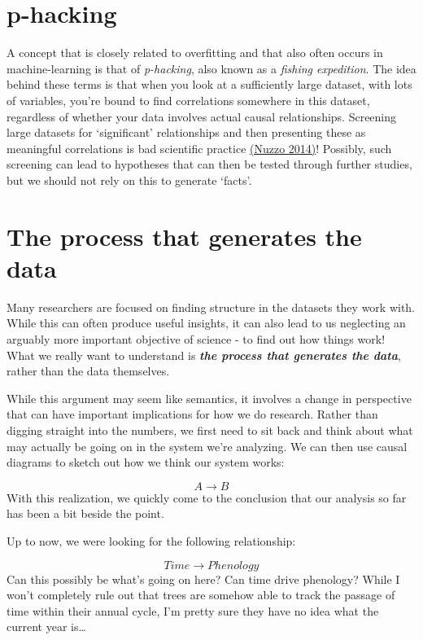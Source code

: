 \documentclass[
]{book}
\begin{document}
\hypertarget{p-hacking}{%
\section{p-hacking}\label{p-hacking}}

A concept that is closely related to overfitting and that also often occurs in machine-learning is that of \emph{p-hacking}, also known as a \emph{fishing expedition}. The idea behind these terms is that when you look at a sufficiently large dataset, with lots of variables, you're bound to find correlations somewhere in this dataset, regardless of whether your data involves actual causal relationships. Screening large datasets for `significant' relationships and then presenting these as meaningful correlations is bad scientific practice \href{https://www.nature.com/news/scientific-method-statistical-errors-1.14700}{(Nuzzo \protect\hyperlink{ref-nuzzo2014scientific}{2014})}! Possibly, such screening can lead to hypotheses that can then be tested through further studies, but we should not rely on this to generate `facts'.

\hypertarget{the-process-that-generates-the-data}{%
\section{The process that generates the data}\label{the-process-that-generates-the-data}}

Many researchers are focused on finding structure in the datasets they work with. While this can often produce useful insights, it can also lead to us neglecting an arguably more important objective of science - to find out how things work! What we really want to understand is \textbf{\emph{the process that generates the data}}, rather than the data themselves.

While this argument may seem like semantics, it involves a change in perspective that can have important implications for how we do research. Rather than digging straight into the numbers, we first need to sit back and think about what may actually be going on in the system we're analyzing. We can then use causal diagrams to sketch out how we think our system works:

\[A \to B\]
With this realization, we quickly come to the conclusion that our analysis so far has been a bit beside the point.

Up to now, we were looking for the following relationship:

\[Time \to Phenology\]
Can this possibly be what's going on here? Can time drive phenology? While I won't completely rule out that trees are somehow able to track the passage of time within their annual cycle, I'm pretty sure they have no idea what the current year is\ldots{}
\end{document}
